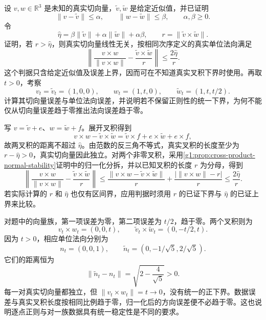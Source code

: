 \begin{exercise}\label{g1:ex:posterior-normal-certificate}
	设 \(v,w\in\mathbb R^3\) 是未知的真实切向量，\(\widetilde v,\widetilde w\) 是给定近似值，并已证明
	\[
		\lVert v-\widetilde v\rVert\le\alpha,\qquad
		\lVert w-\widetilde w\rVert\le\beta,
		\qquad\alpha,\beta\ge0.
	\]
	令
	\[
		\widehat\eta=\beta\lVert\widetilde v\rVert
		+\alpha\lVert\widetilde w\rVert+\alpha\beta,
		\qquad r=\lVert\widetilde v\times\widetilde w\rVert.
	\]
	证明，若 \(r>\widehat\eta\)，则真实切向量线性无关，按相同次序定义的真实单位法向满足
	\[
		\left\lVert\frac{v\times w}{\lVert v\times w\rVert}
		-\frac{\widetilde v\times\widetilde w}{r}\right\rVert
		\le\frac{2\widehat\eta}{r}.
	\]
	这个判据只含给定近似值及误差上界，因而可在不知道真实叉积下界时使用。再取 \(t>0\)，考察
	\[
		v_t=\widetilde v_t=(1,0,0),\qquad
		w_t=(1,t,0),\qquad\widetilde w_t=(1,t,t/2).
	\]
	计算其切向量误差与单位法向误差，并说明若不保留正则性的统一下界，为何不能仅从切向量误差趋于零推出法向误差趋于零。
\end{exercise}
\begin{solution}
	写 \(v=\widetilde v+e\)、\(w=\widetilde w+f\)。展开叉积得到
	\[
		v\times w-\widetilde v\times\widetilde w
		=\widetilde v\times f+e\times\widetilde w+e\times f,
	\]
	故两叉积的距离不超过 \(\widehat\eta\)。由范数的反三角不等式，真实叉积的长度至少为 \(r-\widehat\eta>0\)，真实切向量因此独立。对两个非零叉积，采用\cref{g1:prop:cross-product-normal-stability}证明中的归一化分拆，并以已知叉积的长度 \(r\) 为分母，得到
	\[
		\left\lVert\frac{v\times w}{\lVert v\times w\rVert}
		-\frac{\widetilde v\times\widetilde w}{r}\right\rVert
		\le\frac{\lVert v\times w-\widetilde v\times\widetilde w\rVert}{r}
		+\frac{|\lVert v\times w\rVert-r|}{r}
		\le\frac{2\widehat\eta}{r}.
	\]
	若实际计算的 \(r\) 和 \(\widehat\eta\) 也仅有区间界，应用判据时须用 \(r\) 的已证下界与 \(\widehat\eta\) 的已证上界来比较。

	对题中的向量族，第一项误差为零，第二项误差为 \(t/2\)，趋于零。两个叉积则为
	\[
		v_t\times w_t=(0,0,t),\qquad
		\widetilde v_t\times\widetilde w_t=(0,-t/2,t).
	\]
	因为 \(t>0\)，相应单位法向分别为
	\[
		n_t=(0,0,1),\qquad
		\widetilde n_t=(0,-1/\sqrt5,2/\sqrt5).
	\]
	它们的距离恒为
	\[
		\lVert\widetilde n_t-n_t\rVert
		=\sqrt{2-\frac4{\sqrt5}}>0.
	\]
	每一对真实切向量都独立，但 \(\lVert v_t\times w_t\rVert=t\to0\)，没有统一的正下界。数据误差与真实叉积长度按相同比例趋于零，归一化后的方向误差便不必趋于零。这也说明逐点正则与对一族数据具有统一稳定性是不同的要求。
\end{solution}

